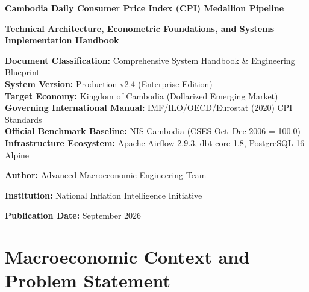 \documentclass[11pt,a4paper]{article}
\begin{document}
\begin{titlepage}
    \centering
    \vspace*{1.2cm}
    
    {\Huge\bfseries\color{NavyBlue} Cambodia Daily Consumer Price Index (CPI) Medallion Pipeline\par}
    \vspace{0.6cm}
    {\LARGE\bfseries\color{Teal} Technical Architecture, Econometric Foundations, and Systems Implementation Handbook\par}
    \vspace{1.2cm}
    
    \begin{tcolorbox}[colback=white,colframe=Teal,width=0.92\textwidth]
        \centering\normalsize
        \textbf{Document Classification:} Comprehensive System Handbook \& Engineering Blueprint\\
        \textbf{System Version:} Production v2.4 (Enterprise Edition)\\
        \textbf{Target Economy:} Kingdom of Cambodia (Dollarized Emerging Market)\\
        \textbf{Governing International Manual:} IMF/ILO/OECD/Eurostat (2020) CPI Standards\\
        \textbf{Official Benchmark Baseline:} NIS Cambodia (CSES Oct--Dec 2006 = 100.0)\\
        \textbf{Infrastructure Ecosystem:} Apache Airflow 2.9.3, dbt-core 1.8, PostgreSQL 16 Alpine
    \end{tcolorbox}
    
    \vfill
    
    {\large\textbf{Author:} Advanced Macroeconomic Engineering Team\par}
    {\large\textbf{Institution:} National Inflation Intelligence Initiative\par}
    {\large\textbf{Publication Date:} September 2026\par}
    \vspace{0.8cm}
\end{titlepage}

\tableofcontents
\newpage

\section{Macroeconomic Context and Problem Statement}
\end{document}
